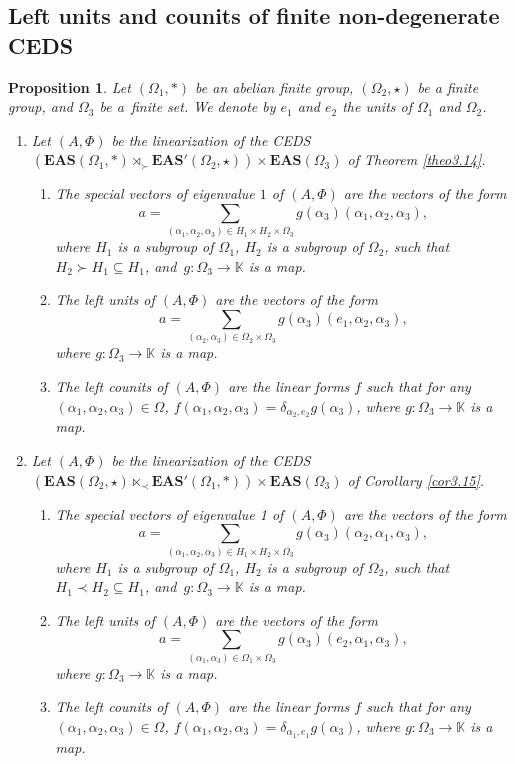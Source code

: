 \documentclass[pdftex]{sigma}
\numberwithin{equation}{section}
\newtheorem{Proposition}[Theorem]{Proposition}
 { \theoremstyle{definition}
\newtheorem{Definition}[Theorem]{Definition}
\newtheorem{Note}[Theorem]{Note}
\newtheorem{Example}[Theorem]{Example}
\newtheorem{Remark}[Theorem]{Remark}
\newtheorem{Notation}[Theorem]{Notation}}
\newcommand{\eas}{\mathbf{EAS}}
\begin{document}
\subsection{Left units and counits of finite non-degenerate CEDS}

\begin{Proposition}\label{prop4.5}
Let $(\Omega_1,*)$ be an abelian finite group, $(\Omega_2,\star)$ be a finite group, and $\Omega_3$ be a~finite set. We denote by $e_1$ and $e_2$ the units of $\Omega_1$ and $\Omega_2$.
\begin{enumerate}\itemsep=0pt
\item[$(1)$] Let $(A,\Phi)$ be the linearization of the CEDS
$(\eas(\Omega_1,*) \rtimes_\succ \eas'(\Omega_2,\star))\times \eas(\Omega_3)$
of Theorem {\rm\ref{theo3.14}}.
\begin{enumerate}\itemsep=0pt
\item[$(a)$] The special vectors of eigenvalue $1$ of $(A,\Phi)$ are the vectors of the form
\[a=\sum_{(\alpha_1,\alpha_2,\alpha_3)\in H_1\times H_2\times \Omega_3}g(\alpha_3)(\alpha_1,\alpha_2,\alpha_3),\]
where $H_1$ is a subgroup of $\Omega_1$, $H_2$ is a subgroup of $\Omega_2$, such that $H_2\succ H_1\subseteq H_1$, and~${g\colon \Omega_3\longrightarrow \mathbb{K}}$ is a map.
\item[$(b)$] The left units of $(A,\Phi)$ are the vectors of the form
\[a=\sum_{(\alpha_2,\alpha_3)\in \Omega_2\times \Omega_3}g(\alpha_3)(e_1,\alpha_2,\alpha_3),\]
where $g\colon \Omega_3\longrightarrow \mathbb{K}$ is a map.
\item[$(c)$] The left counits of $(A,\Phi)$ are the linear forms $f$ such that for any $(\alpha_1,\alpha_2,\alpha_3)\in \Omega$,
$f(\alpha_1,\alpha_2,\alpha_3)=\delta_{\alpha_2,e_2}g(\alpha_3)$,
where $g\colon \Omega_3\longrightarrow \mathbb{K}$ is a map.
\end{enumerate}
\item[$(2)$] Let $(A,\Phi)$ be the linearization of the CEDS
$(\eas(\Omega_2,\star) \ltimes_\prec \eas'(\Omega_1,*))\times \eas(\Omega_3)$
of Corollary {\rm\ref{cor3.15}}.
\begin{enumerate}\itemsep=0pt
\item[$(a)$] The special vectors of eigenvalue 1 of $(A,\Phi)$ are the vectors of the form
\[a=\sum_{(\alpha_1,\alpha_2,\alpha_3)\in H_1\times H_2\times \Omega_3}g(\alpha_3)(\alpha_2,\alpha_1,\alpha_3),\]
where $H_1$ is a subgroup of $\Omega_1$, $H_2$ is a subgroup of $\Omega_2$, such that $H_1\prec H_2\subseteq H_1$, and~${g\colon \Omega_3\longrightarrow \mathbb{K}}$ is a map.
\item[$(b)$] The left units of $(A,\Phi)$ are the vectors of the form
\[a=\sum_{(\alpha_1,\alpha_3)\in \Omega_1\times \Omega_3}g(\alpha_3)(e_2,\alpha_1,\alpha_3),\]
where $g\colon \Omega_3\longrightarrow \mathbb{K}$ is a map.
\item[$(c)$] The left counits of $(A,\Phi)$ are the linear forms $f$ such that for any $(\alpha_1,\alpha_2,\alpha_3)\in \Omega$,
$f(\alpha_1,\alpha_2,\alpha_3)=\delta_{\alpha_1,e_1}g(\alpha_3)$,
where $g\colon \Omega_3\longrightarrow \mathbb{K}$ is a map.
\end{enumerate} \end{enumerate}\end{Proposition}
\end{document}
